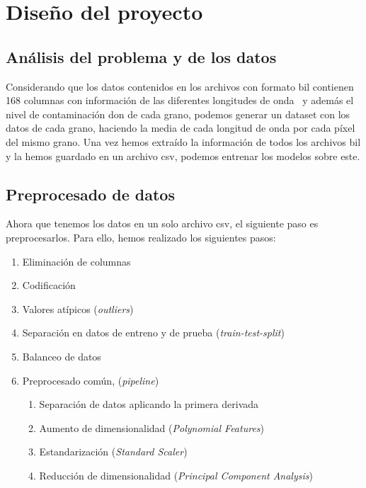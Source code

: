 \section{Diseño del proyecto}\label{sec:diseno}

\subsection{Análisis del problema y de los datos}\label{sec:obtencion}

Considerando que los datos contenidos en los archivos con formato \gls{bil} contienen 168 columnas con información de las diferentes longitudes de onda\ \cite{WhatIsHy18:online} y además el nivel de contaminación \gls{don} de cada grano, podemos generar un \gls{dataset} con los datos de cada grano, haciendo la media de cada longitud de onda por cada píxel del mismo grano. Una vez hemos extraído la información de todos los archivos \gls{bil} y la hemos guardado en un archivo \acrshort{csv}, podemos entrenar los modelos sobre este.

\subsection{Preprocesado de datos}\label{sec:preprocesado}

Ahora que tenemos los datos en un solo archivo \acrshort{csv}, el siguiente paso es preprocesarlos. Para ello, hemos realizado los siguientes pasos: 

\begin{enumerate}
    \item Eliminación de columnas
    \item Codificación
    \item Valores atípicos (\textit{outliers})
    \item Separación en datos de entreno y de prueba (\textit{train-test-split})
    \item Balanceo de datos
    \item Preprocesado común, (\textit{pipeline})
    \begin{enumerate}
        \item Separación de datos aplicando la primera derivada 
        \item Aumento de dimensionalidad (\textit{Polynomial Features})
        \item Estandarización  (\textit{Standard Scaler})
        \item Reducción de dimensionalidad (\textit{Principal Component Analysis})
    \end{enumerate}
    
\end{enumerate}


